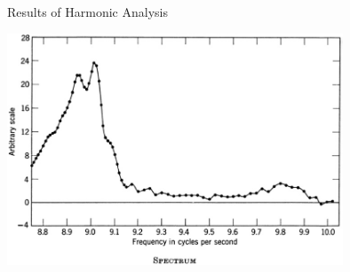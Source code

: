 \documentclass[xetex,notheorems,hyperref={pdfpagelabels=true},xcolor=table]{beamer}
\theoremstyle{plain}
\theoremstyle{definition}
\theoremstyle{example}
\theoremstyle{example}
\begin{document}
\begin{frame}{Results of Harmonic Analysis}
    \begin{center}
            \includegraphics[width = 10cm]{png/frequencies.png}
        \end{center}
\end{frame}
\end{document}
